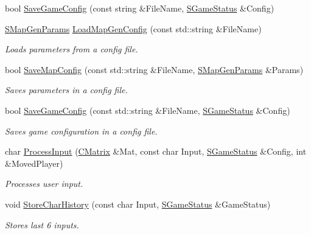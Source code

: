 \begin{DoxyCompactItemize}
bool \hyperlink{namespace_chase_game_a39f8b039151b1a3eef82fdc1c6f52091}{Save\-Game\-Config} (const string \&File\-Name, \hyperlink{struct_chase_game_1_1_s_game_status}{S\-Game\-Status} \&Config)
\item 
\hyperlink{struct_chase_game_1_1_s_map_gen_params}{S\-Map\-Gen\-Params} \hyperlink{namespace_chase_game_a9c5b5d91cb4251cae461faa4ace8a0cf}{Load\-Map\-Gen\-Config} (const std\-::string \&File\-Name)
\begin{DoxyCompactList}\small\item\em Loads parameters from a config file. \end{DoxyCompactList}\item 
bool \hyperlink{namespace_chase_game_a4c62f61c6aac5bf06292aa51294fd211}{Save\-Map\-Config} (const std\-::string \&File\-Name, \hyperlink{struct_chase_game_1_1_s_map_gen_params}{S\-Map\-Gen\-Params} \&Params)
\begin{DoxyCompactList}\small\item\em Saves parameters in a config file. \end{DoxyCompactList}\item 
bool \hyperlink{namespace_chase_game_a561c85a018e34c8baa21f7f500a3c9c7}{Save\-Game\-Config} (const std\-::string \&File\-Name, \hyperlink{struct_chase_game_1_1_s_game_status}{S\-Game\-Status} \&Config)
\begin{DoxyCompactList}\small\item\em Saves game configuration in a config file. \end{DoxyCompactList}\item 
char \hyperlink{namespace_chase_game_a927ceb6d76ebd1a6eb8f2a393db06c86}{Process\-Input} (\hyperlink{namespace_chase_game_a469449f9237e59efce3982127366c550}{C\-Matrix} \&Mat, const char Input, \hyperlink{struct_chase_game_1_1_s_game_status}{S\-Game\-Status} \&Config, int \&Moved\-Player)
\begin{DoxyCompactList}\small\item\em Processes user input. \end{DoxyCompactList}\item 
void \hyperlink{namespace_chase_game_a4b28a3a3594d145b0ce1d1bf179e88a3}{Store\-Char\-History} (const char Input, \hyperlink{struct_chase_game_1_1_s_game_status}{S\-Game\-Status} \&Game\-Status)
\begin{DoxyCompactList}\small\item\em Stores last 6 inputs. \end{DoxyCompactList}\item 

\end{DoxyCompactItemize}
